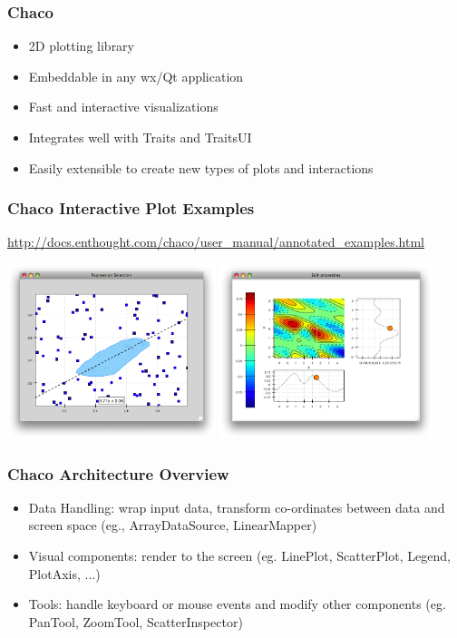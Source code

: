 \documentclass[14pt,compress]{beamer}
\begin{document}
\begin{frame}
  \frametitle{Chaco}
  \begin{itemize}
      \item 2D plotting library
      \item Embeddable in any wx/Qt application
      \item Fast and interactive visualizations
      \item Integrates well with Traits and TraitsUI
      \item Easily extensible to create new types of plots and interactions
  \end{itemize}
\end{frame}

\begin{frame}
  \frametitle{Chaco Interactive Plot Examples}
\scriptsize
\url{http://docs.enthought.com/chaco/user_manual/annotated_examples.html}
\begin{center}
    \includegraphics[height=2in, interpolate=true]{images/chaco_regr}
    \includegraphics[height=2in, interpolate=true]{images/chaco_cmapi}
\end{center}
\end{frame}


\begin{frame}
  \frametitle{Chaco Architecture Overview}
  \begin{itemize}
      \item Data Handling: wrap input data, transform co-ordinates between data and screen space (eg., ArrayDataSource, LinearMapper)
      \item Visual components: render to the screen (eg. LinePlot, ScatterPlot, Legend, PlotAxis, ...)
      \item Tools: handle keyboard or mouse events and modify other components (eg. PanTool, ZoomTool, ScatterInspector)
  \end{itemize}
\end{frame}
\end{document}
